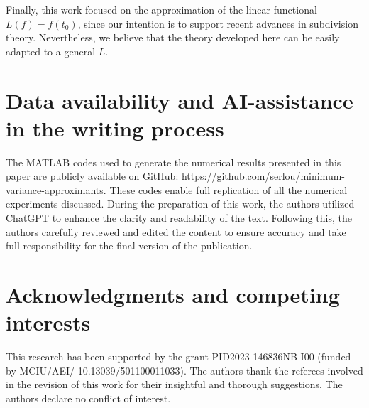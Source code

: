 \documentclass[preprint]{elsarticle}       %
\theoremstyle{plain}
\theoremstyle{remark}
\begin{document}

Finally, this work focused on the approximation of the linear functional $L(f)=f(t_0)$, since our intention is to support recent advances in subdivision theory. Nevertheless, we believe that the theory developed here can be easily adapted to a general $L$.

\vspace{-0.25cm}
\section*{Data availability and AI-assistance in the writing process}
\vspace{-0.15cm}

The MATLAB codes used to generate the numerical results presented in this paper are publicly available on GitHub: \url{https://github.com/serlou/minimum-variance-approximants}. These codes enable full replication of all the numerical experiments discussed.
During the preparation of this work, the authors utilized ChatGPT to enhance the clarity and readability of the text. Following this, the authors carefully reviewed and edited the content to ensure accuracy and take full responsibility for the final version of the publication.

\vspace{-0.25cm}
\section*{Acknowledgments and competing interests}
\vspace{-0.15cm}

This research has been supported by the grant PID2023-146836NB-I00 (funded by MCIU/AEI/ 10.13039/501100011033). The authors thank the referees involved in the revision of this work for their insightful and thorough suggestions. The authors declare no conflict of interest.
\vspace{-0.25cm}
\end{document}

